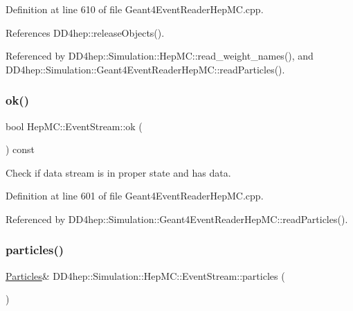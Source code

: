 Definition at line 610 of file Geant4\+Event\+Reader\+Hep\+M\+C.\+cpp.



References D\+D4hep\+::release\+Objects().



Referenced by D\+D4hep\+::\+Simulation\+::\+Hep\+M\+C\+::read\+\_\+weight\+\_\+names(), and D\+D4hep\+::\+Simulation\+::\+Geant4\+Event\+Reader\+Hep\+M\+C\+::read\+Particles().

\hypertarget{class_d_d4hep_1_1_simulation_1_1_hep_m_c_1_1_event_stream_aa3685ed6ee496868702008d626529e9a}{}\label{class_d_d4hep_1_1_simulation_1_1_hep_m_c_1_1_event_stream_aa3685ed6ee496868702008d626529e9a} 
\subsubsection{\texorpdfstring{ok()}{ok()}}
{\footnotesize\ttfamily bool Hep\+M\+C\+::\+Event\+Stream\+::ok (\begin{DoxyParamCaption}{ }\end{DoxyParamCaption}) const}



Check if data stream is in proper state and has data. 



Definition at line 601 of file Geant4\+Event\+Reader\+Hep\+M\+C.\+cpp.



Referenced by D\+D4hep\+::\+Simulation\+::\+Geant4\+Event\+Reader\+Hep\+M\+C\+::read\+Particles().

\hypertarget{class_d_d4hep_1_1_simulation_1_1_hep_m_c_1_1_event_stream_a5a35867853fd21f0c0cf2754bd568671}{}\label{class_d_d4hep_1_1_simulation_1_1_hep_m_c_1_1_event_stream_a5a35867853fd21f0c0cf2754bd568671} 
\subsubsection{\texorpdfstring{particles()}{particles()}}
{\footnotesize\ttfamily \hyperlink{class_d_d4hep_1_1_simulation_1_1_hep_m_c_1_1_event_stream_a99e0260f816229d8ab3ebdd5487b3af1}{Particles}\& D\+D4hep\+::\+Simulation\+::\+Hep\+M\+C\+::\+Event\+Stream\+::particles (\begin{DoxyParamCaption}{ }\end{DoxyParamCaption})\hspace{0.3cm}{\ttfamily [inline]}}



